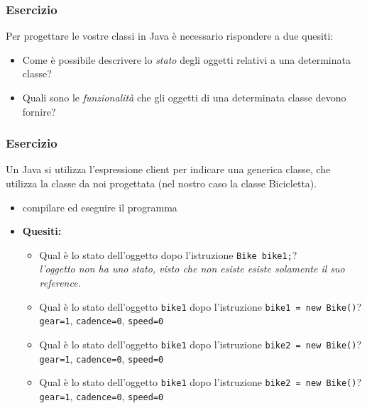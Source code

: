 \documentclass{article}
\theoremstyle{definition}
\begin{document}
\subsubsection{Esercizio}

Per progettare le vostre classi in Java \`e necessario rispondere a due quesiti:
\begin{itemize}
\item Come \`e possibile descrivere lo \emph{stato} degli oggetti relativi a una determinata classe?
\item Quali sono le \emph{funzionalit\`a} che gli oggetti di una determinata classe devono fornire?
\end{itemize}





\subsubsection{Esercizio}

Un Java si utilizza l'espressione client per indicare una generica classe, che utilizza la classe da noi progettata (nel nostro caso la classe Bicicletta). 



\begin{itemize}
\item compilare ed eseguire il programma
\end{itemize}

\begin{itemize}
\item 
\textbf{Quesiti:}\\
\begin{itemize}
\item Qual \`e lo stato dell'oggetto dopo l'istruzione \texttt{Bike bike1;}?\\
\emph{l'oggetto non ha uno stato, visto che non esiste esiste solamente il suo reference.}
\item Qual \`e lo stato dell'oggetto  \texttt{bike1} dopo l'istruzione  \texttt{bike1 = new Bike()}?\\
 \texttt{gear=1}, \texttt{cadence=0}, \texttt{speed=0}
\item Qual \`e lo stato dell'oggetto  \texttt{bike1} dopo l'istruzione \texttt{bike2 = new Bike()}?\\
 \texttt{gear=1}, \texttt{cadence=0}, \texttt{speed=0}
\item Qual \`e lo stato dell'oggetto  \texttt{bike1} dopo l'istruzione \texttt{bike2 = new Bike()}?\\
 \texttt{gear=1}, \texttt{cadence=0}, \texttt{speed=0}
\end{itemize}
\end{itemize}
\end{document}
